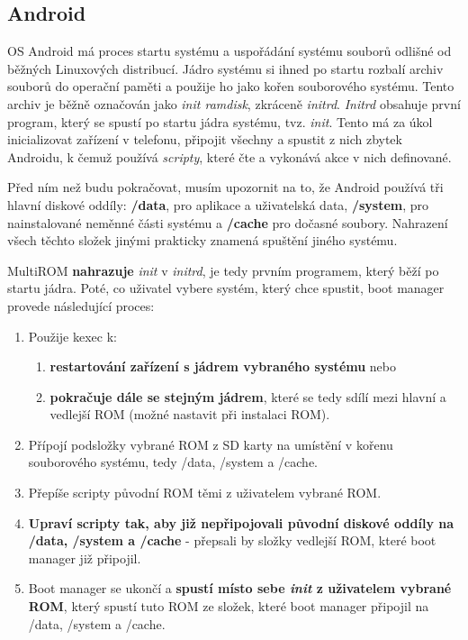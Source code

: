 \documentclass[12pt, a4paper, oneside]{article}
\newcommand{\B}{\textbf} %
\newcommand{\It}{\textit}  %
\begin{document}
\subsection{Android}
OS Android má proces startu systému a uspořádání systému souborů odlišné od běžných Linuxových distribucí. Jádro systému si ihned po startu rozbalí archiv souborů do operační paměti a použije ho jako kořen souborového systému. Tento archiv je běžně označován jako \It{init ramdisk}, zkráceně \It{initrd}. \It{Initrd} obsahuje první program, který se spustí po startu jádra systému, tvz. \It{init}. Tento má za úkol inicializovat zařízení v telefonu, připojit všechny  a spustit z nich zbytek Androidu, k čemuž používá \It{scripty}, které čte a vykonává akce v nich definované.

Před ním než budu pokračovat, musím upozornit na to, že Android používá tři hlavní diskové oddíly: \B{/data}, pro aplikace a uživatelská data, \B{/system}, pro nainstalované neměnné části systému a \B{/cache} pro dočasné soubory. Nahrazení všech těchto složek jinými prakticky znamená spuštění jiného systému.

MultiROM \B{nahrazuje} \It{init} v \It{initrd}, je tedy prvním programem, který běží po startu jádra. Poté, co uživatel vybere systém, který chce spustit, boot manager provede následující proces:

\begin{enumerate}
    \item Použije kexec k:
    \begin{enumerate}
        \item \B{restartování zařízení s jádrem vybraného systému} nebo
        \item \B{pokračuje dále se stejným jádrem}, které se tedy sdílí mezi hlavní a vedlejší ROM (možné nastavit při instalaci ROM).
    \end{enumerate}
    \item Přípojí podsložky vybrané ROM z SD karty na umístění v kořenu souborového systému, tedy /data, /system a /cache.
    \item Přepíše scripty původní ROM těmi z uživatelem vybrané ROM.
    \item \B{Upraví scripty tak, aby již nepřipojovali původní diskové oddíly na /data, /system a /cache} - přepsali by složky vedlejší ROM, které boot manager již připojil.
    \item Boot manager se ukončí a \B{spustí místo sebe \It{init} z uživatelem vybrané ROM}, který spustí tuto ROM ze složek, které boot manager připojil na /data, /system a /cache.
\end{enumerate}
\end{document}
